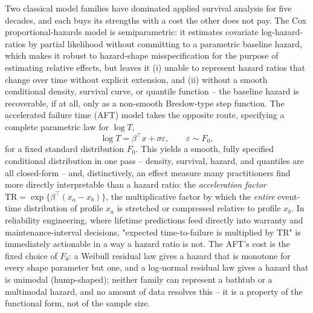 \documentclass[11pt]{article}
\newcommand{\eps}{\varepsilon}
\begin{document}
Two classical model families have dominated applied survival analysis for
five decades, and each buys its strengths with a cost the other does not
pay. The Cox proportional-hazards model \citep{cox1972} is
semiparametric: it estimates covariate log-hazard-ratios by partial
likelihood without committing to a parametric baseline hazard, which
makes it robust to hazard-shape misspecification for the purpose of
estimating relative effects, but leaves it (i) unable to represent hazard
ratios that change over time without explicit extension, and (ii) without
a smooth conditional density, survival curve, or quantile function -- the
baseline hazard is recoverable, if at all, only as a non-smooth
Breslow-type step function. The accelerated failure time (AFT) model
\citep{wei1992aft} takes the opposite route, specifying a complete
parametric law for $\log T$,
\begin{equation}
  \log T = \beta^\top x + \sigma\eps, \qquad \eps \sim F_0,
  \label{eq:aft-intro}
\end{equation}
for a fixed standard distribution $F_0$. This yields a smooth, fully
specified conditional distribution in one pass -- density, survival,
hazard, and quantiles are all closed-form -- and, distinctively, an
effect measure many practitioners find more directly interpretable than a
hazard ratio: the \emph{acceleration factor} $\mathrm{TR} = \exp\{\beta^\top
(x_a - x_b)\}$, the multiplicative factor by which the \emph{entire}
event-time distribution of profile $x_a$ is stretched or compressed
relative to profile $x_b$. In reliability engineering, where lifetime
predictions feed directly into warranty and maintenance-interval
decisions, "expected time-to-failure is multiplied by $\mathrm{TR}$" is
immediately actionable in a way a hazard ratio is not. The AFT's cost is
the fixed choice of $F_0$: a Weibull residual law gives a hazard that is
monotone for every shape parameter but one, and a log-normal residual law
gives a hazard that is unimodal (hump-shaped); neither family can
represent a bathtub or a multimodal hazard, and no amount of data
resolves this -- it is a property of the functional form, not of the
sample size.
\end{document}
